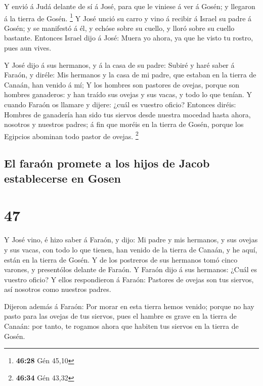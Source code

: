  Y envió á Judá delante de sí á José, para que le viniese
á ver á Gosén; y llegaron á la tierra de Gosén. \footnote{\textbf{46:28}
  Gén 45,10}  Y José unció su carro y vino á recibir á
Israel su padre á Gosén; y se manifestó á él, y echóse sobre su cuello,
y lloró sobre su cuello bastante.  Entonces Israel dijo á
José: Muera yo ahora, ya que he visto tu rostro, pues aun vives.

 Y José dijo á sus hermanos, y á la casa de su padre:
Subiré y haré saber á Faraón, y diréle: Mis hermanos y la casa de mi
padre, que estaban en la tierra de Canaán, han venido á mí;
 Y los hombres son pastores de ovejas, porque son hombres
ganaderos: y han traído sus ovejas y sus vacas, y todo lo que tenían.
 Y cuando Faraón os llamare y dijere: ¿cuál es vuestro
oficio?  Entonces diréis: Hombres de ganadería han sido
tus siervos desde nuestra mocedad hasta ahora, nosotros y nuestros
padres; á fin que moréis en la tierra de Gosén, porque los Egipcios
abominan todo pastor de ovejas. \footnote{\textbf{46:34} Gén 43,32}

\hypertarget{el-farauxf3n-promete-a-los-hijos-de-jacob-establecerse-en-gosen}{%
\subsection{El faraón promete a los hijos de Jacob establecerse en
Gosen}\label{el-farauxf3n-promete-a-los-hijos-de-jacob-establecerse-en-gosen}}

\hypertarget{section-46}{%
\section{47}\label{section-46}}

 Y José vino, é hizo saber á Faraón, y dijo: Mi padre y
mis hermanos, y sus ovejas y sus vacas, con todo lo que tienen, han
venido de la tierra de Canaán, y he aquí, están en la tierra de Gosén.
 Y de los postreros de sus hermanos tomó cinco varones, y
presentólos delante de Faraón.  Y Faraón dijo á sus
hermanos: ¿Cuál es vuestro oficio? Y ellos respondieron á Faraón:
Pastores de ovejas son tus siervos, así nosotros como nuestros padres.

 Dijeron además á Faraón: Por morar en esta tierra hemos
venido; porque no hay pasto para las ovejas de tus siervos, pues el
hambre es grave en la tierra de Canaán: por tanto, te rogamos ahora que
habiten tus siervos en la tierra de Gosén.

